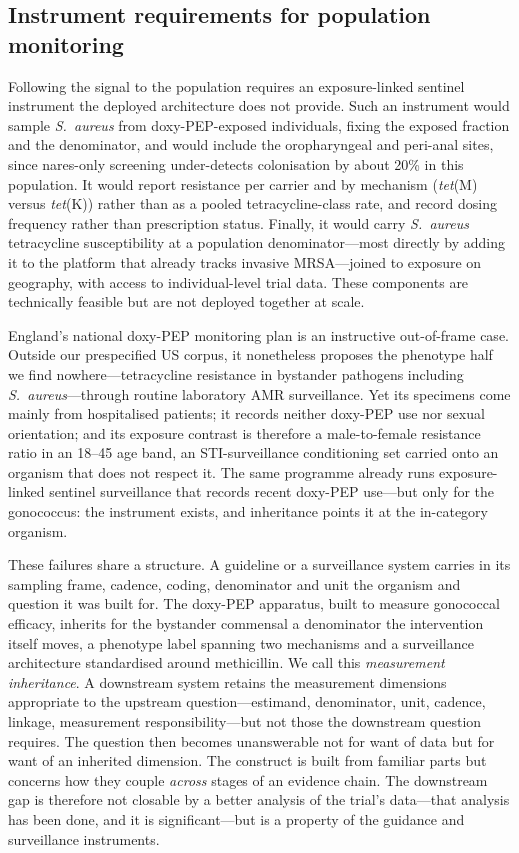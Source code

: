 \documentclass[12pt,a4paper]{article}
\newcommand{\sa}{\emph{S.~aureus}}
\begin{document}
\subsection*{Instrument requirements for population monitoring}
Following the signal to the population requires an exposure-linked sentinel
instrument the deployed architecture does not provide. Such an instrument would
sample \sa{} from doxy-PEP-exposed individuals, fixing the exposed fraction and the
denominator, and would include the oropharyngeal and peri-anal sites, since
nares-only screening under-detects colonisation by about 20\% in this
population.\cite{kyaw2012} It would report resistance per carrier and by mechanism
(\emph{tet}(M) versus \emph{tet}(K)) rather than as a pooled tetracycline-class
rate, and record dosing frequency rather than prescription status. Finally, it
would carry \sa{} tetracycline susceptibility at a population denominator---most
directly by adding it to the platform that already tracks invasive MRSA---joined to
exposure on geography, with access to individual-level trial data. These components
are technically feasible but are not deployed together at scale.

England's national doxy-PEP monitoring plan is an instructive out-of-frame case. Outside our prespecified US corpus, it nonetheless proposes the phenotype
half we find nowhere---tetracycline resistance in bystander pathogens including
\sa{}---through routine laboratory AMR surveillance.\cite{ukhsa2026} Yet its
specimens come mainly from hospitalised patients; it records neither doxy-PEP use
nor sexual orientation; and its exposure contrast is therefore a male-to-female
resistance ratio in an 18--45 age band, an STI-surveillance conditioning set
carried onto an organism that does not respect it. The same programme already runs
exposure-linked sentinel surveillance that records recent doxy-PEP use---but only
for the gonococcus: the instrument exists, and inheritance points it at the
in-category organism.

These failures share a structure. A guideline or a surveillance system carries in
its sampling frame, cadence, coding, denominator and unit the organism and
question it was built for. The doxy-PEP apparatus, built to measure gonococcal
efficacy, inherits for the bystander commensal a denominator the intervention
itself moves, a phenotype label spanning two mechanisms and a surveillance
architecture standardised around methicillin. We call this \emph{measurement inheritance}. A downstream system
retains the measurement dimensions appropriate to the upstream
question---estimand, denominator, unit, cadence, linkage, measurement
responsibility---but not those the downstream question requires. The question then
becomes unanswerable not for want of data but for want of an inherited dimension.
The construct is built from familiar parts but concerns how they couple
\emph{across} stages of an evidence
chain.\cite{tancredi2024surveillance,treem2023visibility} The downstream gap is
therefore not closable by a better analysis of the trial's data---that analysis has
been done, and it is significant---but is a property of the guidance and
surveillance instruments.
\end{document}
